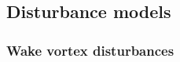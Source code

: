 \documentclass{ifacconf}
\providecommand{\mbf}[1]{\mathbf{#1}}
\newcommand{\idxFollower}{{\ensuremath{i} }}
\newcommand{\idxPredecessor}{{\ensuremath{i-1} }}
\newcommand{\idxAxis}{{\ensuremath{p}}}
\begin{document}






\subsection{Disturbance models}

\subsubsection{\textbf{Wake vortex disturbances}}
\end{document}

